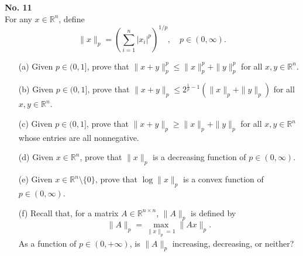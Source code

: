 \documentclass[a4paper, 11pt]{article}
\newenvironment{problem}[2][No.]
    { \begin{mdframed}[backgroundcolor=gray!5] \textbf{#1 #2} \\}
    {  \end{mdframed}}
\begin{document}
\begin{problem}{11}
	For any \( x \in \mathbb{R}^n \), define
$$
	\|x\|_p = \left( \sum_{i = 1}^n |x_i|^p \right)^{1/p}, \quad p \in (0, \infty).
$$
	\begin{enumerate}
		\item[(a)] Given \( p \in (0, 1] \), prove that \( \|x + y\|_p^p \leq \|x\|_p^p + \|y\|_p^p \) for all \( x, y \in \mathbb{R}^n \).
		\item[(b)] Given \( p \in (0, 1] \), prove that \( \|x + y\|_p \leq 2^{\frac{1}{p} - 1} (\|x\|_p + \|y\|_p) \) for all \( x, y \in \mathbb{R}^n \).
		\item[(c)] Given \( p \in (0, 1] \), prove that \( \|x + y\|_p \geq \|x\|_p + \|y\|_p \) for all \( x, y \in \mathbb{R}^n \) whose entries are all nonnegative.
		\item[(d)] Given \( x \in \mathbb{R}^n \), prove that \( \|x\|_p \) is a decreasing function of \( p \in (0, \infty) \).
		\item[(e)] Given \( x \in \mathbb{R}^n \setminus \{0\} \), prove that \( \log \|x\|_p \) is a convex function of \( p \in (0, \infty) \).
		\item[(f)] Recall that, for a matrix \( A \in \mathbb{R}^{n \times n} \), \( \|A\|_p \) is defined by
	$$
		\|A\|_p = \max_{\|x\|_p = 1} \|Ax\|_p.
	$$
		As a function of \( p \in (0, +\infty) \), is \( \|A\|_p \) increasing, decreasing, or neither?
	\end{enumerate}
\end{problem}
\end{document}
